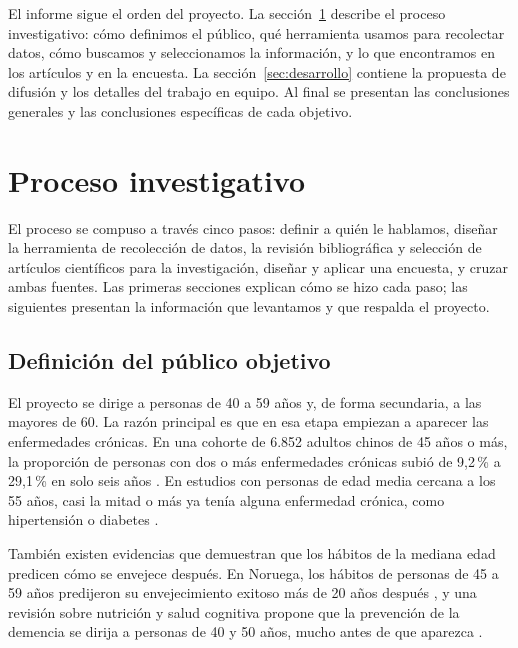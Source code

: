 \documentclass[12pt, letterpaper, table, xcdraw]{extarticle}
\begin{document}
El informe sigue el orden del proyecto. La sección~\ref{sec:proceso} describe el proceso investigativo: cómo definimos el público, qué herramienta usamos para recolectar datos, cómo buscamos y seleccionamos la información, y lo que encontramos en los artículos y en la encuesta. La sección~\ref{sec:desarrollo} contiene la propuesta de difusión y los detalles del trabajo en equipo. Al final se presentan las conclusiones generales y las conclusiones específicas de cada objetivo.
\clearpage


\section{Proceso investigativo}
\label{sec:proceso}

El proceso se compuso a través cinco pasos: definir a quién le hablamos, diseñar la herramienta de recolección de datos, la revisión bibliográfica y selección de artículos científicos para la investigación, diseñar y aplicar una encuesta, y cruzar ambas fuentes. Las primeras secciones explican cómo se hizo cada paso; las siguientes presentan la información que levantamos y que respalda el proyecto. 

\subsection{Definición del público objetivo}

El proyecto se dirige a personas de 40 a 59 años y, de forma secundaria, a las mayores de 60. La razón principal es que  en esa etapa empiezan a aparecer las enfermedades crónicas. En una cohorte de 6.852 adultos chinos de 45 años o más, la proporción de personas con dos o más enfermedades crónicas subió de 9,2\,\% a 29,1\,\% en solo seis años \parencite{zhu2025}. En estudios con personas de edad media cercana a los 55 años, casi la mitad o más ya tenía alguna enfermedad crónica, como hipertensión o diabetes \parencite{naaman2025,kuczmarski2025}.

También existen evidencias que demuestran que los hábitos de la mediana edad predicen cómo se envejece después. En Noruega, los hábitos de personas de 45 a 59 años predijeron su envejecimiento exitoso más de 20 años después \parencite{bosnes2019}, y una revisión sobre nutrición y salud cognitiva propone que la prevención de la demencia se dirija a personas de 40 y 50 años, mucho antes de que aparezca \parencite{puri2023}.
\end{document}

